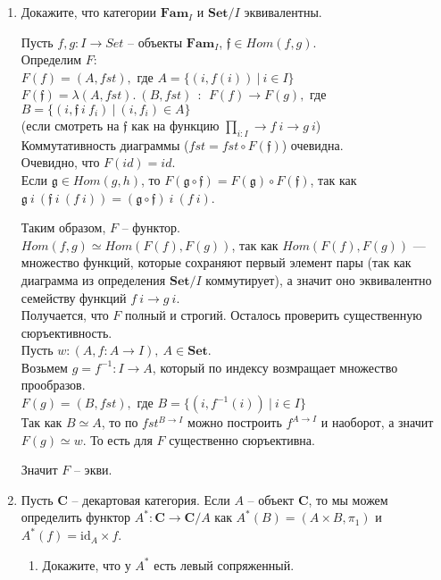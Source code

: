 \documentclass[draft]{article}
\newcommand{\cat}[1]{\mathbf{#1}}
\renewcommand{\C}{\cat{C}}
\newcommand{\Set}{\cat{Set}}
\newcommand{\fs}[1]{\mathrm{#1}}
\newcommand{\id}{\fs{id}}
\begin{document}
\begin{enumerate}
\item Докажите, что категории $\cat{Fam}_I$ и $\Set/I$ эквивалентны.

Пусть $f, g : I \to Set$ -- объекты $\cat{Fam}_I$, $\mathfrak{f} \in Hom(f, g)$.\\
Определим $F$:\\
$F(f) = (A, fst),$ где $A = \{(i, f(i)) ~|~ i \in I\}$\\
$F(\mathfrak{f}) = \lambda (A, fst). ~(B, fst) ~~:~~F(f)\to F(g), $ где\\
 $B = \{(i, \mathfrak{f} ~i~ f_i) ~|~ (i, f_i) \in A \}$\\
(если смотреть на $\mathfrak{f}$ как на функцию $\prod\limits_{i : I} \to f~i \to g~i$)\\
Коммутативность диаграммы ($fst = fst \circ F(\mathfrak{f})$) очевидна.
\\
Очевидно, что $F(id) = id$.  \\
Если $\mathfrak{g}\in Hom(g, h)$, то $F(\mathfrak{g} \circ \mathfrak{f}) = F(\mathfrak{g}) \circ F(\mathfrak{f})$, так как $\mathfrak{g} ~i~ (\mathfrak{f} ~i~ (f~i)) = (\mathfrak{g} \circ \mathfrak{f}) ~i~(f~i)$.

Таким образом, $F$ -- функтор.\\
$Hom(f, g) \simeq Hom(F(f), F(g))$, так как $Hom(F(f), F(g))$ --- множество функций, которые сохраняют первый элемент пары (так как диаграмма из определения $\Set/I$ коммутирует), а значит оно эквивалентно семейству функций 
$f~i \to g~i$.\\

Получается, что $F$ полный и строгий. Осталось проверить существенную сюръективность.\\

Пусть $w : (A, f: A \to I), ~A\in \Set$. \\
Возьмем $g = f^{-1} : I \to A$, который по индексу возмращает множество прообразов.\\

$F(g) = (B, fst),$ где $B = \{ (i, f^{-1}(i)) ~|~ i\in I\}$\\
Так как $B \simeq A$, то по $fst^{B \to I}$ можно построить $f^{A \to I}$ и наоборот, а значит $F(g) \simeq w$. То есть для $F$ существенно сюръективна. 

Значит $F$ -- экви.

\item Пусть $\C$ -- декартовая категория.
Если $A$ -- объект $\C$, то мы можем определить функтор $A^* : \C \to \C/A$ как $A^*(B) = (A \times B, \pi_1)$ и $A^*(f) = \id_A \times f$.
\begin{enumerate}
\item Докажите, что у $A^*$ есть левый сопряженный.


\end{enumerate}
\end{enumerate}
\end{document}
